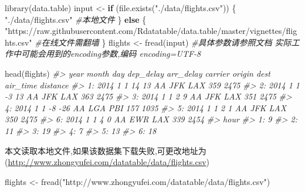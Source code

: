 \documentclass[
]{book}
\newenvironment{Shaded}{\begin{snugshade}}{\end{snugshade}}
\newcommand{\CommentTok}[1]{\textcolor[rgb]{0.56,0.35,0.01}{\textit{#1}}}
\newcommand{\ControlFlowTok}[1]{\textcolor[rgb]{0.13,0.29,0.53}{\textbf{#1}}}
\newcommand{\FunctionTok}[1]{\textcolor[rgb]{0.00,0.00,0.00}{#1}}
\newcommand{\NormalTok}[1]{#1}
\newcommand{\OtherTok}[1]{\textcolor[rgb]{0.56,0.35,0.01}{#1}}
\newcommand{\StringTok}[1]{\textcolor[rgb]{0.31,0.60,0.02}{#1}}
\begin{document}
\begin{Shaded}
\begin{Highlighting}[]
\FunctionTok{library}\NormalTok{(data.table)}
\NormalTok{input }\OtherTok{\textless{}{-}} \ControlFlowTok{if}\NormalTok{ (}\FunctionTok{file.exists}\NormalTok{(}\StringTok{"./data/flights.csv"}\NormalTok{)) \{}
   \StringTok{"./data/flights.csv"} \CommentTok{\#本地文件}
\NormalTok{\} }\ControlFlowTok{else}\NormalTok{ \{}
  \StringTok{"https://raw.githubusercontent.com/Rdatatable/data.table/master/vignettes/flights.csv"} \CommentTok{\#在线文件需翻墙}
\NormalTok{\}}
\NormalTok{flights }\OtherTok{\textless{}{-}} \FunctionTok{fread}\NormalTok{(input) }\CommentTok{\#具体参数请参照文档  实际工作中可能会用到的encoding参数,编码 encoding=\textquotesingle{}UTF{-}8\textquotesingle{}}

\FunctionTok{head}\NormalTok{(flights)}
\CommentTok{\#\textgreater{}    year month day dep\_delay arr\_delay carrier origin dest air\_time distance}
\CommentTok{\#\textgreater{} 1: 2014     1   1        14        13      AA    JFK  LAX      359     2475}
\CommentTok{\#\textgreater{} 2: 2014     1   1        {-}3        13      AA    JFK  LAX      363     2475}
\CommentTok{\#\textgreater{} 3: 2014     1   1         2         9      AA    JFK  LAX      351     2475}
\CommentTok{\#\textgreater{} 4: 2014     1   1        {-}8       {-}26      AA    LGA  PBI      157     1035}
\CommentTok{\#\textgreater{} 5: 2014     1   1         2         1      AA    JFK  LAX      350     2475}
\CommentTok{\#\textgreater{} 6: 2014     1   1         4         0      AA    EWR  LAX      339     2454}
\CommentTok{\#\textgreater{}    hour}
\CommentTok{\#\textgreater{} 1:    9}
\CommentTok{\#\textgreater{} 2:   11}
\CommentTok{\#\textgreater{} 3:   19}
\CommentTok{\#\textgreater{} 4:    7}
\CommentTok{\#\textgreater{} 5:   13}
\CommentTok{\#\textgreater{} 6:   18}
\end{Highlighting}
\end{Shaded}

本文读取本地文件,如果该数据集下载失败,可更改地址为(\url{http://www.zhongyufei.com/datatable/data/flights.csv})

\begin{Shaded}
\begin{Highlighting}[]
\NormalTok{flights }\OtherTok{\textless{}{-}} \FunctionTok{fread}\NormalTok{(}\StringTok{"http://www.zhongyufei.com/datatable/data/flights.csv"}\NormalTok{)}
\end{Highlighting}
\end{Shaded}
\end{document}
